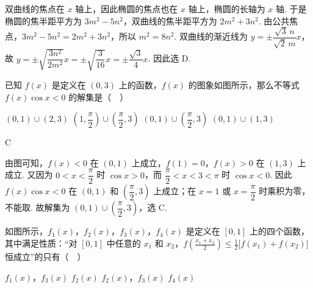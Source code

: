 \begin{solution}
双曲线的焦点在 \(x\) 轴上，因此椭圆的焦点也在 \(x\) 轴上，椭圆的长轴为 \(x\) 轴. 于是椭圆的焦半距平方为 \(3m^2-5n^2\)，双曲线的焦半距平方为 \(2m^2+3n^2\). 由公共焦点，\(3m^2-5n^2=2m^2+3n^2\)，所以 \(m^2=8n^2\).
双曲线的渐近线为 \(y=\pm\dfrac{\sqrt{3}\,n}{\sqrt{2}\,m}x\)，故
\(y=\pm\sqrt{\dfrac{3n^2}{2m^2}}x=\pm\sqrt{\dfrac{3}{16}}x=\pm\dfrac{\sqrt{3}}{4}x\). 因此选 D.
\end{solution}

\begin{problem}
已知 \(f(x)\) 是定义在 \((0,3)\) 上的函数，\(f(x)\) 的图象如图所示，那么不等式 \(f(x)\cos x<0\) 的解集是（\(\quad\)）

\begin{center}
\end{center}

\choices
    {\((0,1)\cup(2,3)\)}
    {\(\left(1,\dfrac{\pi}{2}\right)\cup\left(\dfrac{\pi}{2},3\right)\)}
    {\((0,1)\cup\left(\dfrac{\pi}{2},3\right)\)}
    {\((0,1)\cup(1,3)\)}
\end{problem}

\begin{answer}
C
\end{answer}

\begin{solution}
由图可知，\(f(x)<0\) 在 \((0,1)\) 上成立，\(f(1)=0\)，\(f(x)>0\) 在 \((1,3)\) 上成立. 又因为 \(0<x<\dfrac{\pi}{2}\) 时 \(\cos x>0\)，而 \(\dfrac{\pi}{2}<x<3<\pi\) 时 \(\cos x<0\). 因此 \(f(x)\cos x<0\) 在 \((0,1)\) 和 \(\left(\dfrac{\pi}{2},3\right)\) 上成立；在 \(x=1\) 或 \(x=\dfrac{\pi}{2}\) 时乘积为零，不能取. 故解集为 \((0,1)\cup\left(\dfrac{\pi}{2},3\right)\)，选 C.
\end{solution}

\begin{problem}
如图所示，\(f_{1}(x)\)，\(f_{2}(x)\)，\(f_{3}(x)\)，\(f_{4}(x)\) 是定义在 \([0,1]\) 上的四个函数，其中满足性质：“对 \([0,1]\) 中任意的 \(x_{1}\) 和 \(x_{2}\)，\(\displaystyle f\left(\frac{x_{1}+x_{2}}{2}\right)\leqslant \frac{1}{2}\bigl[f(x_{1})+f(x_{2})\bigr]\) 恒成立”的只有（\(\quad\)）

\begin{center}
\end{center}

\choices
    {\(f_{1}(x)\)，\(f_{3}(x)\)}
    {\(f_{2}(x)\)}
    {\(f_{2}(x)\)，\(f_{3}(x)\)}
    {\(f_{4}(x)\)}
\end{problem}

